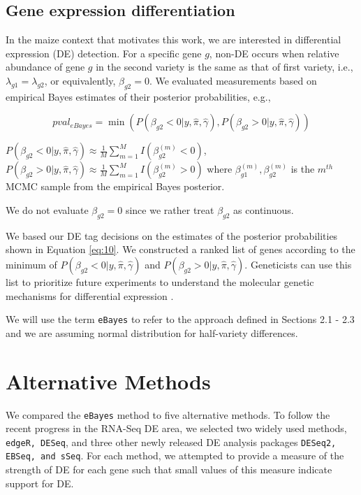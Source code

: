 \subsection{Gene expression differentiation}

In the maize context that motivates this work, we are interested in differential expression (DE) detection. For a specific gene $g$, non-DE occurs when relative abundance of gene $g$ in the second variety is the same as that of first variety, i.e., $\lambda_{g1} = \lambda_{g2}$, or equivalently, $\beta_{g2}=0$.  We evaluated measurements based on empirical Bayes estimates of their posterior probabilities, e.g., 

\begin{equation}
\label{eq:10}
pval_{eBayes}  = \min( P(\beta_{g2}< 0 | y, \hat{\pi}, \hat{\gamma}),  P(\beta_{g2}> 0 | y, \hat{\pi}, \hat{\gamma}))
\end{equation}

$P(\beta_{g2}< 0 | y, \hat{\pi}, \hat{\gamma}) \approx \frac{1}{M} \sum_{m=1}^M I(\beta_{g2} ^ {(m)} < 0)$, $P(\beta_{g2}> 0 | y, \hat{\pi}, \hat{\gamma}) \approx \frac{1}{M} \sum_{m=1}^M I(\beta_{g2} ^ {(m)} > 0) $
where $\beta_{g1}^{(m)}, \beta_{g2}^{(m)}$ is the $m^{th}$ MCMC sample from the empirical Bayes posterior.

We do not evaluate $\beta_{g2}=0$ since we rather treat $\beta_{g2}$ as continuous. 

We based our DE tag decisions on the estimates of the posterior probabilities shown in Equation \eqref{eq:10}. We constructed a ranked list of genes according to the minimum of $P(\beta_{g2}< 0 | y, \hat{\pi}, \hat{\gamma})$ and $P(\beta_{g2}> 0 | y, \hat{\pi}, \hat{\gamma})$. Geneticists can use this list to prioritize future experiments to understand the molecular genetic mechanisms for differential expression \citep{niemi2015empirical}. 

We will use the term \texttt{eBayes} to refer to the approach defined in Sections 2.1 - 2.3 and we are assuming normal distribution for half-variety differences.

\section{Alternative Methods}

We compared the \texttt{eBayes} method to five alternative methods. To follow the recent progress in the RNA-Seq DE area, we selected two widely used methods, {\tt edgeR, DESeq}, and three other newly released DE analysis packages {\tt DESeq2, EBSeq, and sSeq}. For each method, we attempted to provide a measure of the strength of DE for each gene such that small values of this measure indicate support for DE. 

